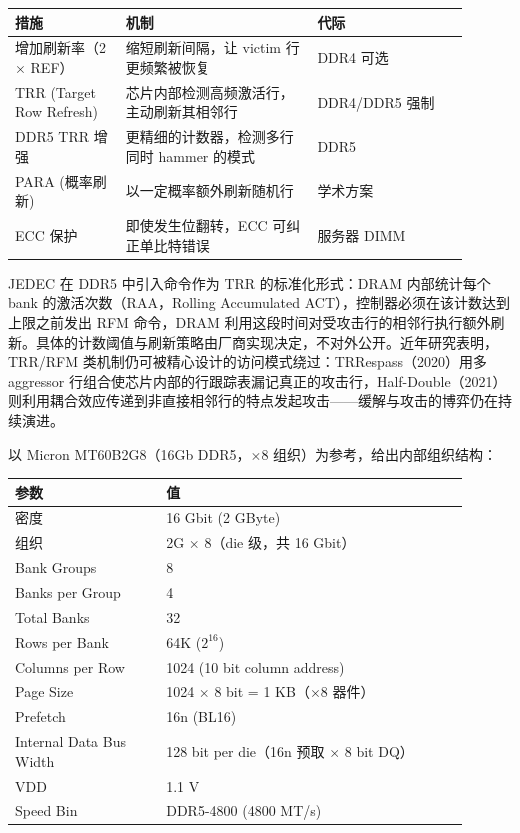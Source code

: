 \begin{longtable}{L{0.22\linewidth}L{0.38\linewidth}L{0.3\linewidth}}
\toprule
措施 & 机制 & 代际 \\
\midrule
增加刷新率（2$\times$ REF） & 缩短刷新间隔，让 victim 行更频繁被恢复 & DDR4 可选 \\
TRR (Target Row Refresh) & 芯片内部检测高频激活行，主动刷新其相邻行 & DDR4/DDR5 强制 \\
DDR5 TRR 增强 & 更精细的计数器，检测多行同时 hammer 的模式 & DDR5 \\
PARA (概率刷新) & 以一定概率额外刷新随机行 & 学术方案 \\
ECC 保护 & 即使发生位翻转，ECC 可纠正单比特错误 & 服务器 DIMM \\
\bottomrule
\end{longtable}

JEDEC 在 DDR5 中引入命令作为 TRR 的标准化形式：DRAM 内部统计每个 bank 的激活次数（RAA，Rolling Accumulated ACT），控制器必须在该计数达到上限之前发出 RFM 命令，DRAM 利用这段时间对受攻击行的相邻行执行额外刷新。具体的计数阈值与刷新策略由厂商实现决定，不对外公开。近年研究表明，TRR/RFM 类机制仍可被精心设计的访问模式绕过：TRRespass（2020）用多 aggressor 行组合使芯片内部的行跟踪表漏记真正的攻击行，Half-Double（2021）则利用耦合效应传递到非直接相邻行的特点发起攻击——缓解与攻击的博弈仍在持续演进。


以 Micron MT60B2G8（16Gb DDR5，$\times$8 组织）为参考，给出内部组织结构：

\begin{longtable}{L{0.3\linewidth}L{0.6\linewidth}}
\toprule
参数 & 值 \\
\midrule
密度 & 16 Gbit (2 GByte) \\
组织 & 2G $\times$ 8（die 级，共 16 Gbit） \\
Bank Groups & 8 \\
Banks per Group & 4 \\
Total Banks & 32 \\
Rows per Bank & 64K ($2^{16}$) \\
Columns per Row & 1024 (10 bit column address) \\
Page Size & 1024 $\times$ 8 bit = 1 KB（$\times$8 器件） \\
Prefetch & 16n (BL16) \\
Internal Data Bus Width & 128 bit per die（16n 预取 $\times$ 8 bit DQ） \\
VDD & 1.1 V \\
Speed Bin & DDR5-4800 (4800 MT/s) \\
\bottomrule
\end{longtable}

